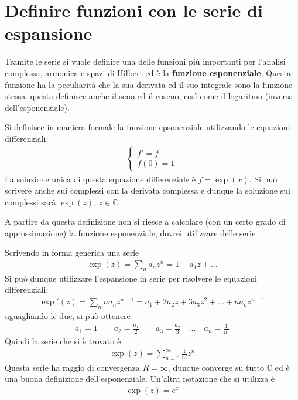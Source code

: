 \documentclass[a4paper, oneside]{article}
\begin{document}
\section{Definire funzioni con le serie di espansione}
Tramite le serie si vuole definire una delle funzioni più importanti 
per l'analisi complessa, armonica e spazi di Hilbert ed è la 
\textbf{funzione esponenziale}. Questa funzione ha la peculiarità che
la sua derivata ed il suo integrale sono la funzione stessa. questa definisce 
anche il seno ed il coseno, così come il logaritmo (inversa dell'esponenziale).
\begin{definition}
    Si definisce in maniera formale la funzione epsonenziale utilizzando
    le equazioni differenziali:
    \begin{gather*}
        \left\{\begin{array}{l}
            f' = f \\
            f(0) = 1
        \end{array}\right.
    \end{gather*}
    La soluzione unica di questa equazione differenziale è $f = \exp(x)$. 
    Si può scrivere anche sui complessi con la derivata complessa e
    dunque la soluzione sui complessi sarà $\exp (z)$, $z \in \mathbb{C}$.
\end{definition}
A partire da questa definizione non si riesce a calcolare (con un
certo grado di approssimazione) la funzione esponenziale, dovrei utilizzare
delle serie
\begin{definition}
    Scrivendo in forma generica una serie
    \begin{gather*}
        \exp(z) = \sum_{n}^{} a_nz^{n} = 1 + a_1 z+ \dots
    \end{gather*}
    Si può dunque utilizzare l'espansione in serie per risolvere le 
    equazioni differenziali:
    \begin{gather*}
        \exp'(z) = \sum_{n }^{} na_nz^{n - 1} = a_1 + 2a_2 z + 3a_3 z^{2} + \dots + na_nz^{n - 1}
    \end{gather*}
    uguagliando le due, si può ottenere
    \begin{gather*}
        a_1 = 1 \qquad a_2 = \frac{a_1}{2} \qquad a_3 = \frac{a_2}{3} \quad\dots\quad a_n = \frac{1}{n!}
    \end{gather*}
    Quindi la serie che si è trovato è
    \begin{gather*}
        \exp(z) = \sum_{n = 0}^{\infty } \frac{1}{n!}z^{n}
    \end{gather*}
    Questa serie ha raggio di convergenza $R = \infty$, dunque converge su tutto $\mathbb{C}$ 
    ed è una buona definizione dell'esponenziale. Un'altra notazione che si utilizza è
    \begin{gather*}
        \exp(z) = e^{z}
    \end{gather*}
\end{definition} \noindent
\end{document}
